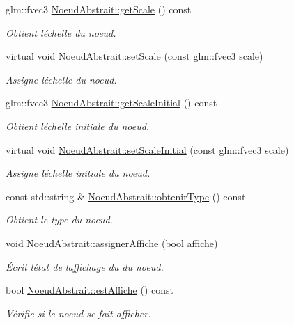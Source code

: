 \begin{DoxyCompactItemize}
glm\+::fvec3 \hyperlink{group__inf2990_ga153a0490acbbaeda4647496e51d37894}{Noeud\+Abstrait\+::get\+Scale} () const 
\begin{DoxyCompactList}\small\item\em Obtient l\textquotesingle{}échelle du noeud. \end{DoxyCompactList}\item 
virtual void \hyperlink{group__inf2990_gaef8fd99796f85418adac496160a3350b}{Noeud\+Abstrait\+::set\+Scale} (const glm\+::fvec3 scale)
\begin{DoxyCompactList}\small\item\em Assigne l\textquotesingle{}échelle du noeud. \end{DoxyCompactList}\item 
glm\+::fvec3 \hyperlink{group__inf2990_gab229ec2d195c9e9bfa1a4c0f80b582ca}{Noeud\+Abstrait\+::get\+Scale\+Initial} () const 
\begin{DoxyCompactList}\small\item\em Obtient l\textquotesingle{}échelle initiale du noeud. \end{DoxyCompactList}\item 
virtual void \hyperlink{group__inf2990_gae51f2e4da1ff9308a55324d4aafd72db}{Noeud\+Abstrait\+::set\+Scale\+Initial} (const glm\+::fvec3 scale)
\begin{DoxyCompactList}\small\item\em Assigne l\textquotesingle{}échelle initiale du noeud. \end{DoxyCompactList}\item 
const std\+::string \& \hyperlink{group__inf2990_ga2df7c53ab456cc88bce73f7eb913e3e6}{Noeud\+Abstrait\+::obtenir\+Type} () const 
\begin{DoxyCompactList}\small\item\em Obtient le type du noeud. \end{DoxyCompactList}\item 
void \hyperlink{group__inf2990_gad5205d1e1b63fb66175a8580261d5eea}{Noeud\+Abstrait\+::assigner\+Affiche} (bool affiche)
\begin{DoxyCompactList}\small\item\em Écrit l\textquotesingle{}état de l\textquotesingle{}affichage du du noeud. \end{DoxyCompactList}\item 
bool \hyperlink{group__inf2990_ga07fc02e86d59ccd2680f9e5f5b8e373d}{Noeud\+Abstrait\+::est\+Affiche} () const 
\begin{DoxyCompactList}\small\item\em Vérifie si le noeud se fait afficher. \end{DoxyCompactList}\item 

\end{DoxyCompactItemize}

